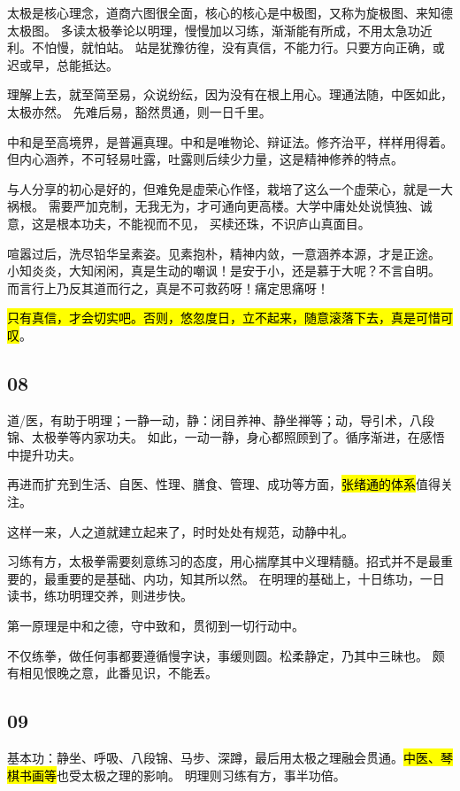 太极是核心理念，道商六图很全面，核心的核心是中极图，又称为旋极图、来知德太极图。
多读太极拳论以明理，慢慢加以习练，渐渐能有所成，不用太急功近利。不怕慢，就怕站。
站是犹豫彷徨，没有真信，不能力行。只要方向正确，或迟或早，总能抵达。

理解上去，就至简至易，众说纷纭，因为没有在根上用心。理通法随，中医如此，太极亦然。
先难后易，豁然贯通，则一日千里。

中和是至高境界，是普遍真理。中和是唯物论、辩证法。修齐治平，样样用得着。
但内心涵养，不可轻易吐露，吐露则后续少力量，这是精神修养的特点。

与人分享的初心是好的，但难免是虚荣心作怪，栽培了这么一个虚荣心，就是一大祸根。
需要严加克制，无我无为，才可通向更高楼。大学中庸处处说慎独、诚意，这是根本功夫，不能视而不见，
买椟还珠，不识庐山真面目。

喧嚣过后，洗尽铅华呈素姿。见素抱朴，精神内敛，一意涵养本源，才是正途。
小知炎炎，大知闲闲，真是生动的嘲讽！是安于小，还是慕于大呢？不言自明。
而言行上乃反其道而行之，真是不可救药呀！痛定思痛呀！

\hl{只有真信，才会切实吧。否则，悠忽度日，立不起来，随意滚落下去，真是可惜可叹}。

\subsection{08}

道/医，有助于明理；一静一动，静：闭目养神、静坐禅等；动，导引术，八段锦、太极拳等内家功夫。
如此，一动一静，身心都照顾到了。循序渐进，在感悟中提升功夫。

再进而扩充到生活、自医、性理、膳食、管理、成功等方面，\hl{张绪通的体系}值得关注。

这样一来，人之道就建立起来了，时时处处有规范，动静中礼。

习练有方，太极拳需要刻意练习的态度，用心揣摩其中义理精髓。招式并不是最重要的，最重要的是基础、内功，知其所以然。
在明理的基础上，十日练功，一日读书，练功明理交养，则进步快。

第一原理是中和之德，守中致和，贯彻到一切行动中。

不仅练拳，做任何事都要遵循慢字诀，事缓则圆。松柔静定，乃其中三昧也。
颇有相见恨晚之意，此番见识，不能丢。

\subsection{09}

基本功：静坐、呼吸、八段锦、马步、深蹲，最后用太极之理融会贯通。\hl{中医、琴棋书画等}也受太极之理的影响。
明理则习练有方，事半功倍。

